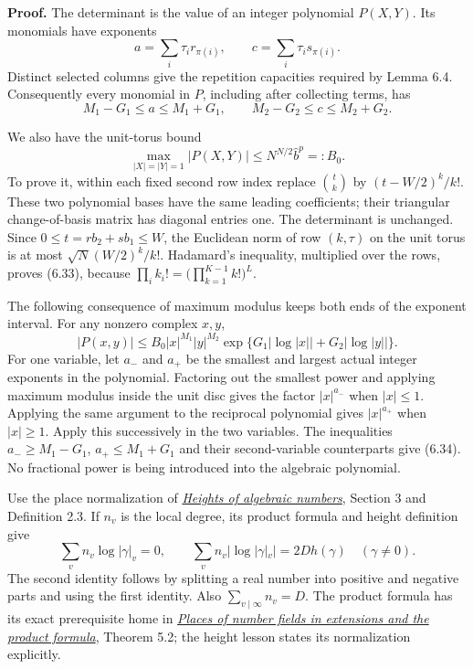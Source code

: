 \documentclass[
  11pt,
  a4paper,
]{article}
\begin{document}
\textbf{Proof.} The determinant is the value of an integer polynomial
\(P(X,Y)\). Its monomials have exponents \[
a=\sum_i\tau_i r_{\pi(i)},\qquad c=\sum_i\tau_i s_{\pi(i)}.
\] Distinct selected columns give the repetition capacities required by
Lemma 6.4. Consequently every monomial in \(P\), including after
collecting terms, has \[
M_1-G_1\le a\le M_1+G_1,\qquad
M_2-G_2\le c\le M_2+G_2.
\tag{6.32}
\]

We also have the unit-torus bound \[
\max_{|X|=|Y|=1}|P(X,Y)|\le N^{N/2}\widehat b^p=:B_0.
\tag{6.33}
\] To prove it, within each fixed second row index replace
\(\binom{t}{k}\) by \((t-W/2)^k/k!\). These two polynomial bases have
the same leading coefficients; their triangular change-of-basis matrix
has diagonal entries one. The determinant is unchanged. Since
\(0\le t=rb_2+sb_1\le W\), the Euclidean norm of row \((k,\tau)\) on the
unit torus is at most \(\sqrt N(W/2)^k/k!\). Hadamard's inequality,
multiplied over the rows, proves (6.33), because
\(\prod_i k_i!=\bigl(\prod_{k=1}^{K-1}k!\bigr)^L\).

The following consequence of maximum modulus keeps both ends of the
exponent interval. For any nonzero complex \(x,y\), \[
|P(x,y)|\le B_0|x|^{M_1}|y|^{M_2}
\exp\{G_1|\log|x||+G_2|\log|y||\}.
\tag{6.34}
\] For one variable, let \(a_-\) and \(a_+\) be the smallest and largest
actual integer exponents in the polynomial. Factoring out the smallest
power and applying maximum modulus inside the unit disc gives the factor
\(|x|^{a_-}\) when \(|x|\le1\). Applying the same argument to the
reciprocal polynomial gives \(|x|^{a_+}\) when \(|x|\ge1\). Apply this
successively in the two variables. The inequalities \(a_-\ge M_1-G_1\),
\(a_+\le M_1+G_1\) and their second-variable counterparts give (6.34).
No fractional power is being introduced into the algebraic polynomial.

Use the place normalization of
\href{https://kokunoyumeto.github.io/open-math-courses-public/courses/TR-TRANS/TR-TRANS-02.html\#3-the-arithmetic-normalization-and-the-weil-height}{\emph{Heights
of algebraic numbers}}, Section 3 and Definition 2.3. If \(n_v\) is the
local degree, its product formula and height definition give \[
\sum_vn_v\log|\gamma|_v=0,\qquad
\sum_vn_v|\log|\gamma|_v|=2Dh(\gamma)
\quad(\gamma\ne0).
\tag{6.35}
\] The second identity follows by splitting a real number into positive
and negative parts and using the first identity. Also
\(\sum_{v\mid\infty}n_v=D\). The product formula has its exact
prerequisite home in
\href{https://kokunoyumeto.github.io/open-math-courses-public/courses/NT-LOC/NT-LOC-05.html\#5-norms-and-the-normalized-product-formula}{\emph{Places
of number fields in extensions and the product formula}}, Theorem 5.2;
the height lesson states its normalization explicitly.
\end{document}

